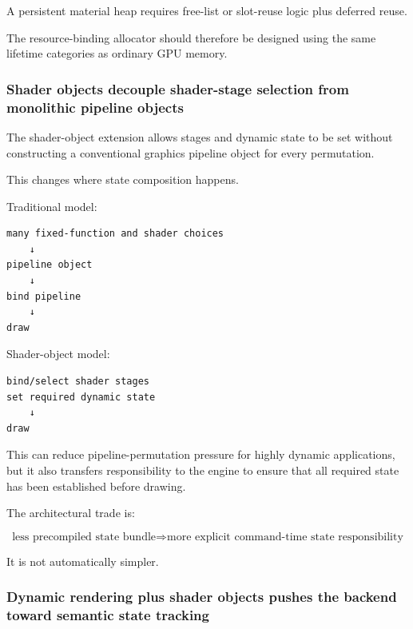 A persistent material heap requires free-list or slot-reuse logic plus deferred reuse.

The resource-binding allocator should therefore be designed using the same lifetime categories as ordinary GPU memory.

\subsubsection{Shader objects decouple shader-stage selection from monolithic pipeline objects}\label{05-engine-i-ch023-shader-objects-decouple-shader-stage-selection-from-monolithic-pipeline-objects}

\hypertarget{05-engine-i-ch023-shader-objects-decouple-shader-stage-selection-from-monolithic-pipeline-objects}{}

The shader-object extension allows stages and dynamic state to be set without constructing a conventional graphics pipeline object for every permutation.

This changes where state composition happens.

Traditional model:

\begin{verbatim}
many fixed-function and shader choices
    ↓
pipeline object
    ↓
bind pipeline
    ↓
draw
\end{verbatim}

Shader-object model:

\begin{verbatim}
bind/select shader stages
set required dynamic state
    ↓
draw
\end{verbatim}

This can reduce pipeline-permutation pressure for highly dynamic applications, but it also transfers responsibility to the engine to ensure that all required state has been established before drawing.

The architectural trade is:

\[
\boxed{
\text{less precompiled state bundle}
\Rightarrow
\text{more explicit command-time state responsibility}
}
\]

It is not automatically simpler.

\subsubsection{Dynamic rendering plus shader objects pushes the backend toward semantic state tracking}\label{05-engine-i-ch023-dynamic-rendering-plus-shader-objects-pushes-the-backend-toward-semantic-state-tracking}

